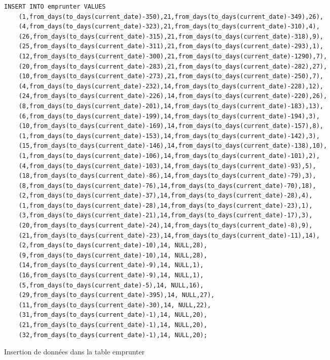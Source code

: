 \documentclass{article}
\begin{document}
\begin{listing}[H]
	\begin{verbatim}
INSERT INTO emprunter VALUES
	(1,from_days(to_days(current_date)-350),21,from_days(to_days(current_date)-349),26),
	(4,from_days(to_days(current_date)-323),21,from_days(to_days(current_date)-310),4),
	(26,from_days(to_days(current_date)-315),21,from_days(to_days(current_date)-318),9),
	(25,from_days(to_days(current_date)-311),21,from_days(to_days(current_date)-293),1),
	(12,from_days(to_days(current_date)-300),21,from_days(to_days(current_date)-1290),7),
	(20,from_days(to_days(current_date)-283),21,from_days(to_days(current_date)-282),27),
	(10,from_days(to_days(current_date)-273),21,from_days(to_days(current_date)-250),7),
	(4,from_days(to_days(current_date)-232),14,from_days(to_days(current_date)-228),12),
	(24,from_days(to_days(current_date)-226),14,from_days(to_days(current_date)-220),26),
	(8,from_days(to_days(current_date)-201),14,from_days(to_days(current_date)-183),13),
	(6,from_days(to_days(current_date)-199),14,from_days(to_days(current_date)-194),3),
	(10,from_days(to_days(current_date)-169),14,from_days(to_days(current_date)-157),8),
	(1,from_days(to_days(current_date)-153),14,from_days(to_days(current_date)-142),3),
	(15,from_days(to_days(current_date)-146),14,from_days(to_days(current_date)-138),10),
	(1,from_days(to_days(current_date)-106),14,from_days(to_days(current_date)-101),2),
	(4,from_days(to_days(current_date)-103),14,from_days(to_days(current_date)-93),5),
	(18,from_days(to_days(current_date)-86),14,from_days(to_days(current_date)-79),3),
	(8,from_days(to_days(current_date)-76),14,from_days(to_days(current_date)-70),18),
	(2,from_days(to_days(current_date)-37),14,from_days(to_days(current_date)-28),4),
	(1,from_days(to_days(current_date)-28),14,from_days(to_days(current_date)-23),1),
	(3,from_days(to_days(current_date)-21),14,from_days(to_days(current_date)-17),3),
	(20,from_days(to_days(current_date)-24),14,from_days(to_days(current_date)-8),9),
	(21,from_days(to_days(current_date)-23),14,from_days(to_days(current_date)-11),14),
	(2,from_days(to_days(current_date)-10),14, NULL,28),
	(9,from_days(to_days(current_date)-10),14, NULL,28),
	(14,from_days(to_days(current_date)-9),14, NULL,1),
	(16,from_days(to_days(current_date)-9),14, NULL,1),
	(5,from_days(to_days(current_date)-5),14, NULL,16),
	(29,from_days(to_days(current_date)-395),14, NULL,27),
	(11,from_days(to_days(current_date)-30),14, NULL,22),
	(31,from_days(to_days(current_date)-1),14, NULL,20),
	(21,from_days(to_days(current_date)-1),14, NULL,20),
	(32,from_days(to_days(current_date)-1),14, NULL,20);
\end{verbatim}
	\caption{Insertion de données dans la table emprunter}
\end{listing}
\end{document}
